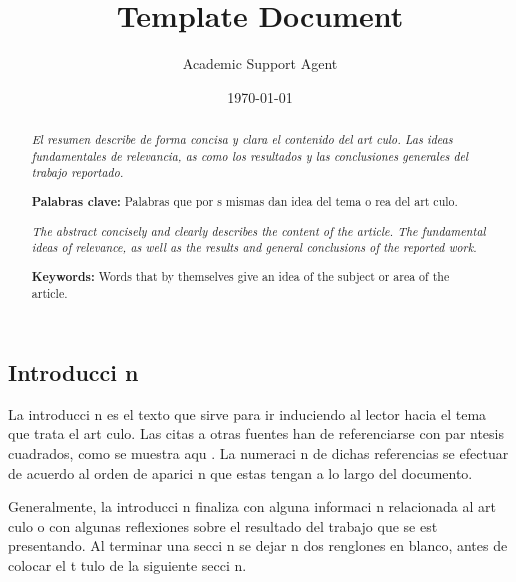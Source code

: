 \documentclass{article}
\title{Template Document}
\author{Academic Support Agent}
\date{\today}
\begin{document}
\maketitle

\maketitle


\begin{abstract}
    \textit{\normalsize El resumen describe de forma concisa y clara el contenido del art culo. Las ideas fundamentales de relevancia, as  como los resultados y las conclusiones generales del trabajo reportado.}
    
    \vspace{0.5cm}

    \textbf{Palabras clave:} Palabras que por s  mismas dan idea del tema o  rea del art culo.
\end{abstract}


\begin{abstract}
    \textit{\normalsize The abstract concisely and clearly describes the content of the article. The fundamental ideas of relevance, as well as the results and general conclusions of the reported work.}
    
    \vspace{0.5cm}

    \textbf{Keywords:} Words that by themselves give an idea of the subject or area of the article.
\end{abstract}



\begin{center}
    \section{Introducci n}
\end{center}

    La introducci n es el texto que sirve para ir induciendo al lector hacia el tema que trata el art culo. Las citas a otras fuentes han de referenciarse con par ntesis cuadrados, como se muestra aqu  \cite{greenwade93}. La numeraci n de dichas referencias se efectuar  de acuerdo al orden de aparici n que estas tengan a lo largo del documento.

    Generalmente, la introducci n finaliza con alguna informaci n relacionada al art culo o con algunas reflexiones sobre el resultado del trabajo que se est  presentando. Al terminar una secci n se dejar n dos renglones en blanco, antes de colocar el t tulo de la siguiente secci n.
\end{document}
